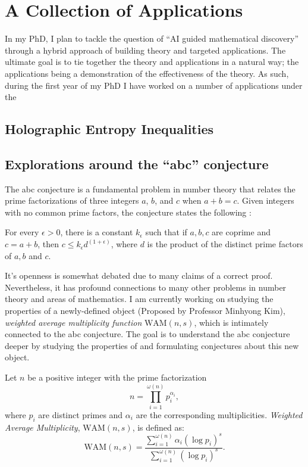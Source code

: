 \chapter{A Collection of Applications}
In my PhD, I plan to tackle the question of ``AI guided mathematical discovery'' through a hybrid approach of building theory and targeted applications. The ultimate goal is to tie together the theory and applications in a natural way; the applications being a demonstration of the effectiveness of the theory. As such, during the first year of my PhD I have worked on a number
of applications under the 
\section{Holographic Entropy Inequalities}
\section{Explorations around the ``abc'' conjecture}

The abc conjecture is a fundamental problem in number theory that relates the prime factorizations of three integers $a$, $b$, and $c$ when $a + b = c$. Given integers with no common prime factors, the conjecture states the following \cite{masser1985open}:
\begin{conjecture}
    \label{abc}
    For every $\epsilon > 0$, there is a constant $k_\epsilon$ such that if $a,b,c$ are coprime and $c = a + b$, then $c\leq k_\epsilon d^{(1 + \epsilon)}$, where $d$ is the product of the distinct prime factors of $a, b$ and $c$.
\end{conjecture}
It's openness is somewhat debated due to many claims of a correct proof. Nevertheless, it has profound connections to many other problems in number theory and areas of mathematics. I am currently working on studying the properties of a newly-defined object (Proposed by Professor Minhyong Kim), \emph{weighted average multiplicity function} $\text{WAM}(n, s)$,
which is intimately connected to the abc conjecture. The goal is to understand the abc conjecture deeper by studying the properties of and formulating conjectures about this new object.

\begin{definition}
    Let $n$ be a positive integer with the prime factorization 
    \[
    n = \prod_{i=1}^{\omega(n)} p_i^{\alpha_i},
    \]
    where $p_i$ are distinct primes and $\alpha_i$ are the corresponding multiplicities.
    \emph{Weighted Average Multiplicity}, $\text{WAM}(n, s)$, is defined as:
    \[
    \text{WAM}(n, s) = \frac{\sum_{i=1}^{\omega(n)} \alpha_i (\log p_i)^s}{\sum_{i=1}^{\omega(n)} (\log p_i)^s}.
    \]
\end{definition}

